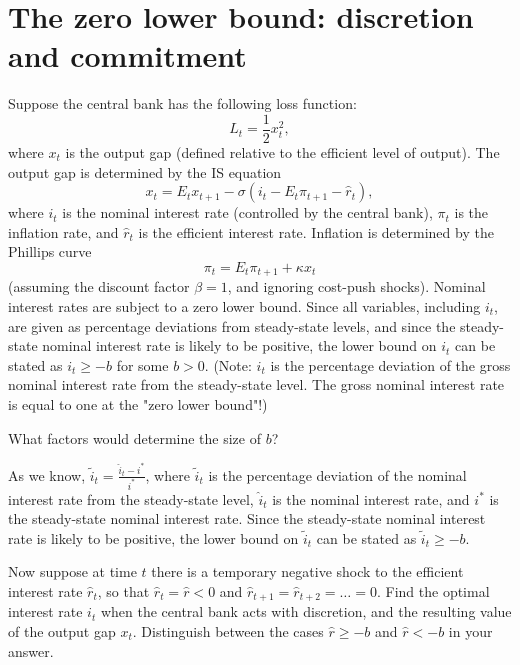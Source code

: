 \section*{The zero lower bound: discretion and commitment}
Suppose the central bank has the following loss function:
\[
L_t = \frac{1}{2} x_t^2,
\]
where $x_t$ is the output gap (defined relative to the efficient level of output). The output gap is determined by the IS equation
\[
x_t = E_t x_{t+1} - \sigma(i_t - E_t \pi_{t+1} - \hat{r}_t),
\]
where $i_t$ is the nominal interest rate (controlled by the central bank), $\pi_t$ is the inflation rate, and $\hat{r}_t$ is the efficient interest rate. Inflation is determined by the Phillips curve
\[
\pi_t = E_t \pi_{t+1} + \kappa x_t
\]
(assuming the discount factor $\beta = 1$, and ignoring cost-push shocks).
Nominal interest rates are subject to a zero lower bound. Since all variables, including $i_t$, are given as percentage deviations from steady-state levels, and since the steady-state nominal interest rate is likely to be positive, the lower bound on $i_t$ can be stated as $i_t \geq -b$ for some $b > 0$. (Note: $i_t$ is the percentage deviation of the gross nominal interest rate from the steady-state level. The gross nominal interest rate is equal to one at the "zero lower bound"!)

\begin{problem*}[1]
What factors would determine the size of $b$?
\end{problem*}

\begin{solution}
    As we know, $\tilde{i}_t = \frac{\hat{i}_t - i^*}{i^*}$, where $\tilde{i}_t$ is the percentage deviation of the nominal interest rate from the steady-state level, $\hat{i}_t$ is the nominal interest rate, and $i^*$ is the steady-state nominal interest rate. 
    Since the steady-state nominal interest rate is likely to be positive, the lower bound on $\tilde{i}_t$ can be stated as $\tilde{i}_t \geq -b$. 
\end{solution}

\begin{problem*}[2]
Now suppose at time $t$ there is a temporary negative shock to the efficient interest rate $\hat{r}_t$, so that $\hat{r}_t = \hat{r} < 0$ and $\hat{r}_{t+1} = \hat{r}_{t+2} = \ldots = 0$.
Find the optimal interest rate $i_t$ when the central bank acts with discretion, and the resulting value of the output gap $x_t$. Distinguish between the cases $\hat{r} \geq -b$ and $\hat{r} < -b$ in your answer.
\end{problem*}

